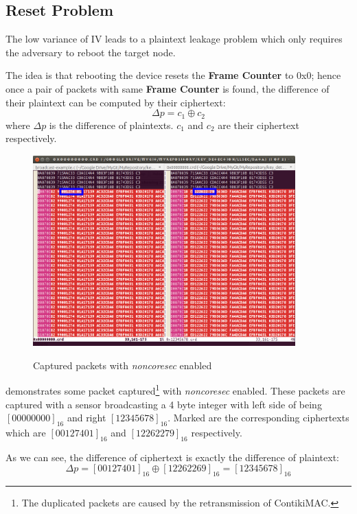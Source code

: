 \subsection{Reset Problem}
The low variance of IV leads to a plaintext leakage problem which only requires the adversary to reboot the target node. 

The idea is that rebooting the device resets the \textbf{Frame Counter} to 0x0; hence once a pair of packets with same \textbf{Frame Counter} is found, the difference of their plaintext can be computed by their ciphertext:
\begin{equation*}
\Delta p = c_1 \oplus c_2
\end{equation*}
where $\Delta p$ is the difference of plaintexts. $c_1$ and $c_2$ are their ciphertext respectively.

\begin{example}
\begin{figure}
\centering
{
	\includegraphics[width=0.9\textwidth,]{fig/resetproblem.png} 
}
\caption{Captured packets with {\it noncoresec} enabled} \label{Fig: reset problem}
\end{figure}

 demonstrates some packet captured\footnote{The duplicated packets are caused by the retransmission of ContikiMAC\cite{ContikiMAC}.} with {\it noncoresec} enabled. These packets are captured with a sensor broadcasting a 4 byte integer with left side of  being $[00000000]_{16}$ and right $[12345678]_{16}$. Marked are the corresponding ciphertexts which are $[00127401]_{16}$ and $[12262279]_{16}$ respectively.

As we can see, the difference of ciphertext is exactly the difference of plaintext:
\begin{equation}
\Delta p = [00127401]_{16} \oplus [12262269]_{16} = [12345678]_{16}
\end{equation}
\end{example}

